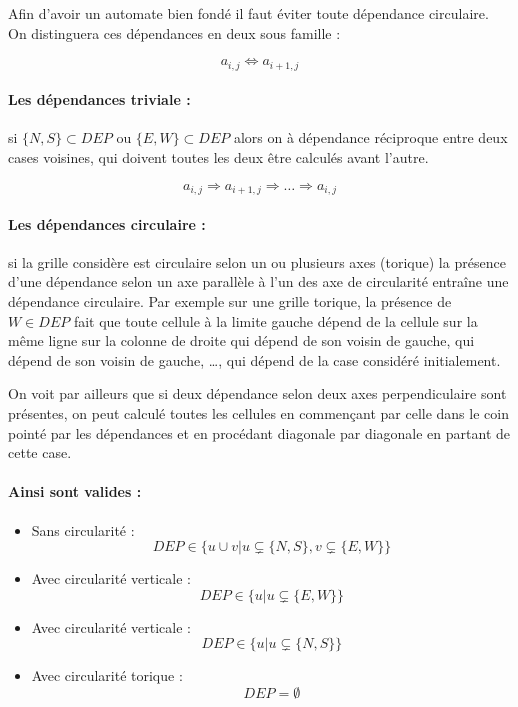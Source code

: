 \documentclass{article}
\begin{document}
\par Afin d'avoir un automate bien fondé il faut éviter toute dépendance circulaire. On distinguera ces dépendances en deux sous famille :

$$a_{i,j} \Leftrightarrow a_{i+1, j}$$
\paragraph{Les dépendances triviale :} si $\{N,S\} \subset DEP$ ou $\{E,W\}\subset DEP$ alors on à dépendance réciproque entre deux cases voisines, qui doivent toutes les deux être calculés avant l'autre. 

$$a_{i,j} \Rightarrow a_{i+1,j} \Rightarrow \ldots \Rightarrow a_{i,j}$$
\paragraph{Les dépendances circulaire :} si la grille considère est circulaire selon un ou plusieurs axes (torique) la présence d'une dépendance selon un axe parallèle à l'un des axe de circularité entraîne une dépendance circulaire. Par exemple sur une grille torique, la présence de $W\in DEP$ fait que toute cellule à la limite gauche dépend de la cellule sur la même ligne sur la colonne de droite qui dépend de son voisin de gauche, qui dépend de son voisin de gauche, \ldots, qui dépend de la case considéré initialement.

\par On voit par ailleurs que si deux dépendance selon deux axes perpendiculaire sont présentes, on peut calculé toutes les cellules en commençant par celle dans le coin pointé par les dépendances et en procédant diagonale par diagonale en partant de cette case.

\paragraph{Ainsi sont valides :}
\begin{itemize}
	\item Sans circularité :
		$$DEP \in \{u \cup v | u \varsubsetneq \{N,S\}, v \varsubsetneq \{E,W\}\}$$
	\item Avec circularité verticale :
		$$DEP \in \{u | u \varsubsetneq \{E,W\}\}$$
	\item Avec circularité verticale :
		$$DEP \in \{u | u \varsubsetneq \{N,S\}\}$$
	\item Avec circularité torique :
		$$DEP = \emptyset$$
\end{itemize}
\end{document}
